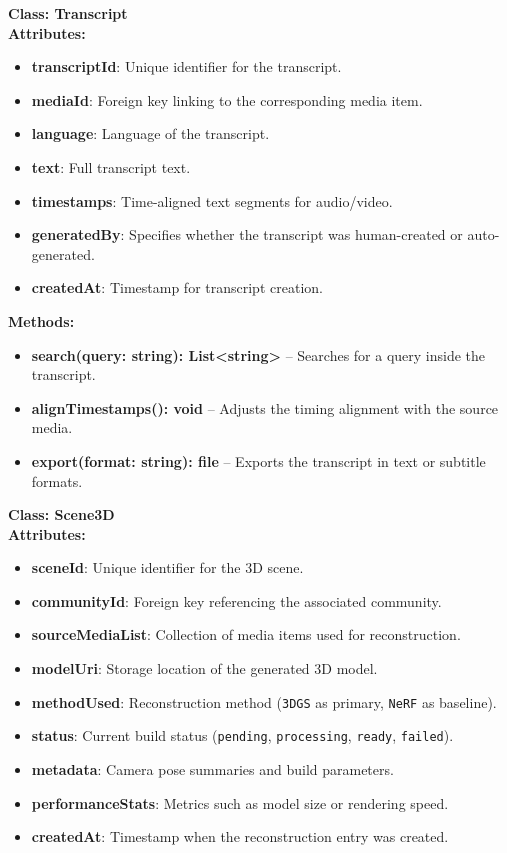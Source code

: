 \bigskip
\textbf{Class: Transcript}\\
\textbf{Attributes:}
\begin{itemize}
    \item \textbf{transcriptId}: Unique identifier for the transcript.
    \item \textbf{mediaId}: Foreign key linking to the corresponding media item.
    \item \textbf{language}: Language of the transcript.
    \item \textbf{text}: Full transcript text.
    \item \textbf{timestamps}: Time-aligned text segments for audio/video.
    \item \textbf{generatedBy}: Specifies whether the transcript was human-created or auto-generated.
    \item \textbf{createdAt}: Timestamp for transcript creation.
\end{itemize}

\textbf{Methods:}
\begin{itemize}
    \item \textbf{search(query: string): List<string>} -- Searches for a query inside the transcript.
    \item \textbf{alignTimestamps(): void} -- Adjusts the timing alignment with the source media.
    \item \textbf{export(format: string): file} -- Exports the transcript in text or subtitle formats.
\end{itemize}


\bigskip
\textbf{Class: Scene3D}\\
\textbf{Attributes:}
\begin{itemize}
    \item \textbf{sceneId}: Unique identifier for the 3D scene.
    \item \textbf{communityId}: Foreign key referencing the associated community.
    \item \textbf{sourceMediaList}: Collection of media items used for reconstruction.
    \item \textbf{modelUri}: Storage location of the generated 3D model.
    \item \textbf{methodUsed}: Reconstruction method (\texttt{3DGS} as primary, \texttt{NeRF} as baseline).
    \item \textbf{status}: Current build status (\texttt{pending}, \texttt{processing}, \texttt{ready}, \texttt{failed}).
    \item \textbf{metadata}: Camera pose summaries and build parameters.
    \item \textbf{performanceStats}: Metrics such as model size or rendering speed.
    \item \textbf{createdAt}: Timestamp when the reconstruction entry was created.
\end{itemize}

